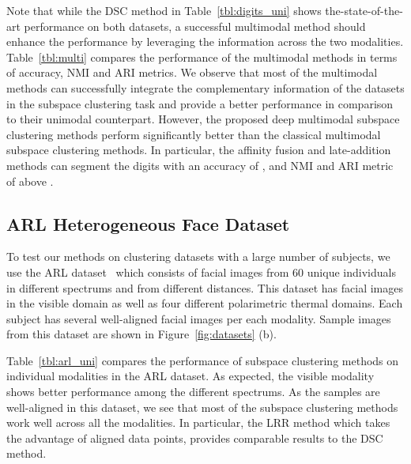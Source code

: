 \documentclass[journal]{IEEEtran}
\begin{document}
Note that while the DSC method in Table~\ref{tbl:digits_uni} shows the-state-of-the-art performance on both datasets, a successful multimodal method should enhance the performance by leveraging the information across the two modalities.		   Table~\ref{tbl:multi} compares the performance of the multimodal methods in terms of accuracy, NMI and ARI metrics.		  We observe that most of the multimodal methods can successfully integrate the complementary information of the datasets in the subspace clustering task and provide a better performance in comparison to their unimodal counterpart.    However, the proposed deep multimodal subspace clustering methods perform significantly better than the classical multimodal subspace clustering methods.  In particular, the affinity fusion and late-addition methods can segment the digits with an accuracy of , and NMI and ARI metric of above .



\subsection{ARL Heterogeneous Face Dataset}
To test our methods on clustering datasets with a large number of subjects, we use the ARL dataset~\cite{hu2016polarimetric} which consists of facial images from 60 unique individuals in different spectrums and from different distances.		  This dataset has  facial images in the visible domain as well as  four different polarimetric thermal domains.		        Each subject has several well-aligned facial images per each modality.		         Sample images from this dataset are shown in Figure~\ref{fig:datasets} (b).  

Table~\ref{tbl:arl_uni} compares the performance of subspace clustering methods on individual modalities in the ARL dataset.		 As expected, the visible modality shows better performance among the different spectrums.	  As the samples are well-aligned in this dataset, we see that most of the subspace clustering methods work well across all the modalities.    In particular, the LRR method which takes the advantage of aligned data points, provides comparable results to the DSC method.
\end{document}

